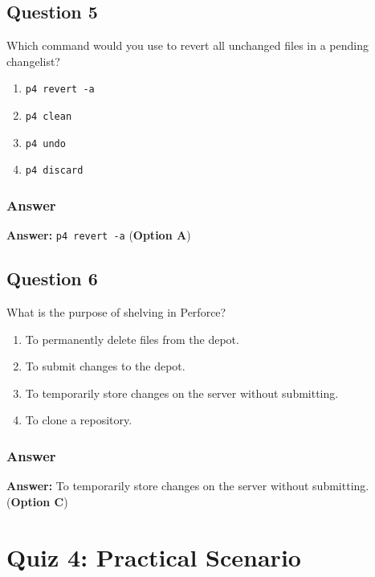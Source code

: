 \documentclass{article}
\begin{document}
\subsection*{Question 5}

Which command would you use to revert all unchanged files in a pending changelist?

\begin{enumerate}
    \item \texttt{p4 revert -a}
    \item \texttt{p4 clean}
    \item \texttt{p4 undo}
    \item \texttt{p4 discard}
\end{enumerate}

\subsubsection*{Answer}

\textbf{Answer:} \texttt{p4 revert -a} (\textbf{Option A})

\hrulefill

\subsection*{Question 6}

What is the purpose of shelving in Perforce?

\begin{enumerate}
    \item To permanently delete files from the depot.
    \item To submit changes to the depot.
    \item To temporarily store changes on the server without submitting.
    \item To clone a repository.
\end{enumerate}

\subsubsection*{Answer}

\textbf{Answer:} To temporarily store changes on the server without submitting. (\textbf{Option C})

\hrulefill

\section*{Quiz 4: Practical Scenario}
\end{document}

